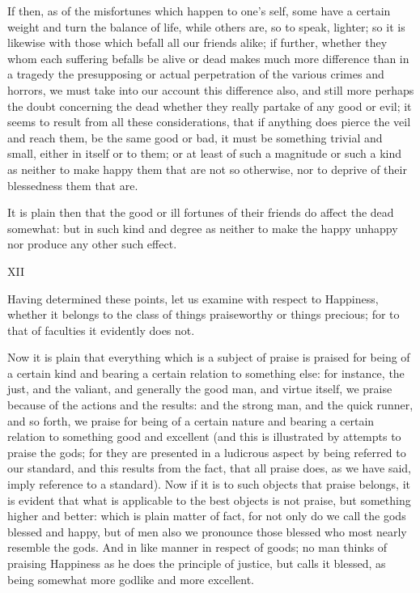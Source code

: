If then, as of the misfortunes which happen to one's self, some have a
certain weight and turn the balance of life, while others are, so to
speak, lighter; so it is likewise with those which befall all our
friends alike; if further, whether they whom each suffering befalls
be alive or dead makes much more difference than in a tragedy the
presupposing or actual perpetration of the various crimes and horrors,
we must take into our account this difference also, and still more
perhaps the doubt concerning the dead whether they really partake of any
good or evil; it seems to result from all these considerations, that if
anything does pierce the veil and reach them, be the same good or bad,
it must be something trivial and small, either in itself or to them; or
at least of such a magnitude or such a kind as neither to make happy
them that are not so otherwise, nor to deprive of their blessedness them
that are.

It is plain then that the good or ill fortunes of their friends do
affect the dead somewhat: but in such kind and degree as neither to make
the happy unhappy nor produce any other such effect.


XII

Having determined these points, let us examine with respect to
Happiness, whether it belongs to the class of things praiseworthy or
things precious; for to that of faculties it evidently does not.

Now it is plain that everything which is a subject of praise is praised
for being of a certain kind and bearing a certain relation to something
else: for instance, the just, and the valiant, and generally the good
man, and virtue itself, we praise because of the actions and the
results: and the strong man, and the quick runner, and so forth, we
praise for being of a certain nature and bearing a certain relation to
something good and excellent (and this is illustrated by attempts to
praise the gods; for they are presented in a ludicrous aspect by being
referred to our standard, and this results from the fact, that all
praise does, as we have said, imply reference to a standard). Now if
it is to such objects that praise belongs, it is evident that what is
applicable to the best objects is not praise, but something higher and
better: which is plain matter of fact, for not only do we call the gods
blessed and happy, but of men also we pronounce those blessed who most
nearly resemble the gods. And in like manner in respect of goods; no man
thinks of praising Happiness as he does the principle of justice, but
calls it blessed, as being somewhat more godlike and more excellent.

